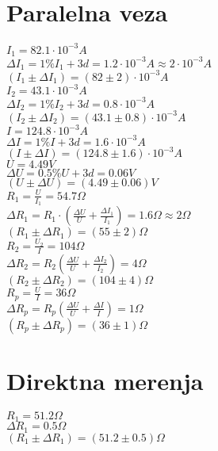 \documentclass[11pt]{article}
\newcommand\D{\displaystyle}
\begin{document}
\section{Paralelna veza}

$I_1 = 82.1\cdot 10^{-3}A$\\
$\Delta I_1 = 1\%I_1+3d = 1.2\cdot 10^{-3}A\approx 2\cdot 10^{-3}A$\\
$(I_1\pm\Delta I_1) = (82\pm 2)\cdot 10^{-3}A$\\

$I_2 = 43.1\cdot 10^{-3}A$\\
$\Delta I_2 = 1\%I_2+3d = 0.8\cdot 10^{-3}A$\\
$(I_2\pm\Delta I_2) = (43.1\pm 0.8)\cdot 10^{-3}A$\\

$I = 124.8\cdot 10^{-3}A$\\
$\Delta I = 1\%I+3d = 1.6\cdot 10^{-3}A$\\
$(I\pm\Delta I) = (124.8\pm 1.6)\cdot 10^{-3}A$\\

$U = 4.49V$\\
$\Delta U = 0.5\%U+3d = 0.06V$\\
$(U\pm\Delta U) = (4.49\pm 0.06)V$\\

$R_1 =\D\frac{U}{I_1} = 54.7\Omega$\\
$\Delta R_1 = R_1\cdot\left(\D\frac{\Delta U}{U}+\D\frac{\Delta I_1}{I_1}\right) = 1.6\Omega\approx 2\Omega$\\
$(R_1\pm\Delta R_1) = (55\pm 2)\Omega$\\

$R_2 =\D\frac{U_2}{I} = 104\Omega$\\
$\Delta R_2 = R_2\left(\D\frac{\Delta U}{U}+\D\frac{\Delta I_2}{I_2}\right) = 4\Omega$\\
$(R_2\pm\Delta R_2) = (104 \pm 4)\Omega$\\

$R_p = \D\frac{U}{I} = 36\Omega$\\
$\Delta R_p = R_p \left(\D\frac{\Delta U}{U}+\D\frac{\Delta I}{I}\right) = 1\Omega$\\
$(R_p\pm\Delta R_p) = (36\pm 1)\Omega$\\

\section{Direktna merenja}

$R_1 = 51.2\Omega$\\
$\Delta R_1 = 0.5\Omega$\\
$(R_1\pm\Delta R_1) = (51.2\pm 0.5)\Omega$\\
\end{document}
